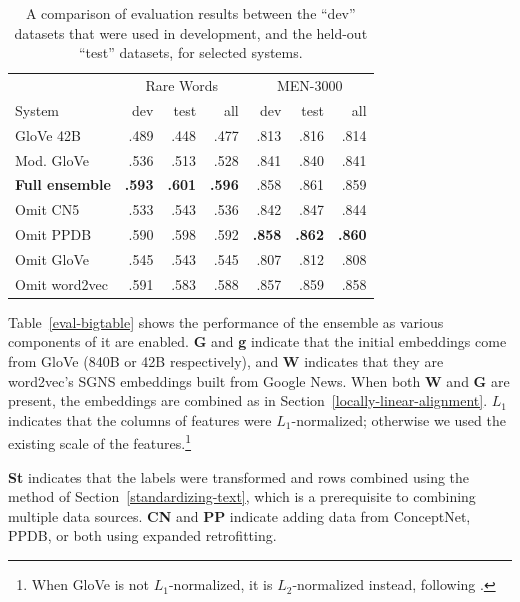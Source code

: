 \documentclass[11pt,letterpaper]{article}
\begin{document}
\begin{table}[t]
\footnotesize
\centering
\begin{tabular}{l|rrr|rrr}
\toprule
                   & \multicolumn{3}{|c|}{Rare Words} & \multicolumn{3}{|c}{MEN-3000} \\
System             &       dev &     test &      all &      dev &     test &      all \\
\midrule
GloVe 42B          &      .489 &     .448 &     .477 &     .813 &     .816 &     .814 \\
Mod. GloVe         &      .536 &     .513 &     .528 &     .841 &     .840 &     .841 \\
\bf Full ensemble  & \bf  .593 & \bf .601 & \bf .596 &     .858 &     .861 &     .859 \\
Omit CN5           &      .533 &     .543 &     .536 &     .842 &     .847 &     .844 \\
Omit PPDB          &      .590 &     .598 &     .592 & \bf .858 & \bf .862 & \bf .860 \\
Omit GloVe         &      .545 &     .543 &     .545 &     .807 &     .812 &     .808 \\
Omit word2vec      &      .591 &     .583 &     .588 &     .857 &     .859 &     .858 \\
\bottomrule
\end{tabular}

\caption{
    A comparison of evaluation results between the ``dev'' datasets that were
    used in development, and the held-out ``test'' datasets, for selected systems.
}
\label{eval-dev-test}
\end{table}


Table~\ref{eval-bigtable} shows the performance of the ensemble as various
components of it are enabled. {\bf G} and {\bf g} indicate that the initial
embeddings come from GloVe (840B or 42B respectively), and {\bf W} indicates
that they are word2vec's SGNS embeddings built from Google News. When both
{\bf W} and {\bf G} are present, the embeddings are combined as in
Section~\ref{locally-linear-alignment}. $L_1$ indicates that the columns of
features were $L_1$-normalized; otherwise we used the existing scale of the
features.\footnote{
    When GloVe is not $L_1$-normalized, it is $L_2$-normalized instead,
    following .
}

{\bf St} indicates that the labels were transformed and rows combined using the
method of Section~\ref{standardizing-text}, which is a prerequisite to combining
multiple data sources. {\bf CN} and {\bf PP} indicate adding data from
ConceptNet, PPDB, or both using expanded retrofitting.
\end{document}

